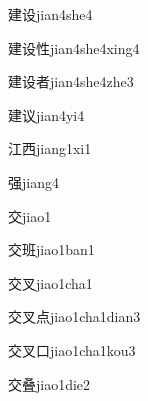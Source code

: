\begin{verbete}[8;6]{建设}{jian4she4}
\end{verbete}

\begin{verbete}[8;6;8]{建设性}{jian4she4xing4}
\end{verbete}

\begin{verbete}[8;6;8]{建设者}{jian4she4zhe3}
\end{verbete}

\begin{verbete}[8;5]{建议}{jian4yi4}
\end{verbete}

\begin{verbete*}[6;6]{江西}{jiang1xi1}
\end{verbete*}

\begin{verbete}[12]{强}{jiang4}
\end{verbete}

\begin{verbete}[6]{交}{jiao1}
\end{verbete}

\begin{verbete}[6;10]{交班}{jiao1ban1}
\end{verbete}

\begin{verbete}[6;3]{交叉}{jiao1cha1}
\end{verbete}

\begin{verbete}[6;3;3]{交叉点}{jiao1cha1dian3}
\end{verbete}

\begin{verbete}[6;3;3]{交叉口}{jiao1cha1kou3}
\end{verbete}

\begin{verbete}[6;13]{交叠}{jiao1die2}
\end{verbete}

